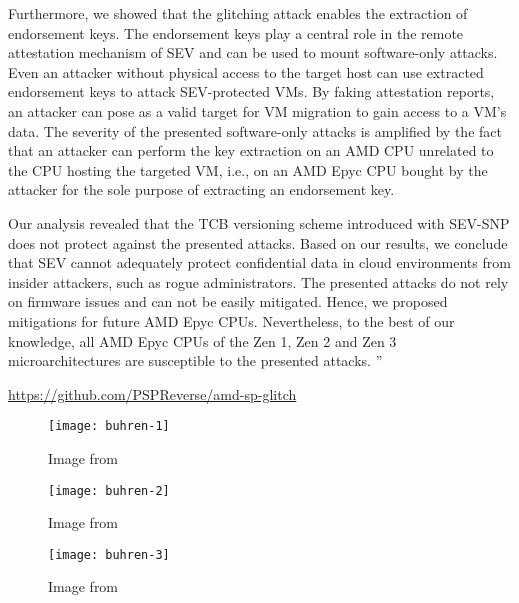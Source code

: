 Furthermore, we showed that the glitching attack enables the extraction of endorsement keys. The endorsement keys play a central role in the remote attestation mechanism of SEV and can be used to mount software-only attacks. Even an attacker without physical access to the target host can use extracted endorsement keys to attack SEV-protected VMs. By faking attestation reports, an attacker can pose as a valid target for VM migration to gain access to a VM’s data. The severity of the presented software-only attacks is amplified by the fact that an attacker can perform the key extraction on an AMD CPU unrelated to the CPU hosting the targeted VM, i.e., on an AMD Epyc CPU bought by the attacker for the sole purpose of extracting an endorsement key.

Our analysis revealed that the TCB versioning scheme introduced with SEV-SNP does not protect against the presented attacks. Based on our results, we conclude that SEV cannot adequately protect confidential data in cloud environments from insider attackers, such as rogue administrators. The presented attacks do not rely on firmware issues and can not be easily mitigated. Hence, we proposed mitigations for future AMD Epyc CPUs. Nevertheless, to the best of our knowledge, all AMD Epyc CPUs of the Zen 1, Zen 2 and Zen 3 microarchitectures are susceptible to the presented attacks. ”


\url{https://github.com/PSPReverse/amd-sp-glitch }

\begin{figure}[!ht]
    \centering
    \texttt{[image: buhren-1]}
    \caption{Image from \cite{buhren_one_2021}}
    \label{fig:buhren-1}
\end{figure}

\begin{figure}[!ht]
    \centering
    \texttt{[image: buhren-2]}
    \caption{Image from \cite{buhren_one_2021}}
    \label{fig:buhren-2}
\end{figure}
\begin{figure}[!ht]
    \centering
    \texttt{[image: buhren-3]}
    \caption{Image from \cite{buhren_one_2021}}
    \label{fig:buhren-3}
\end{figure}
